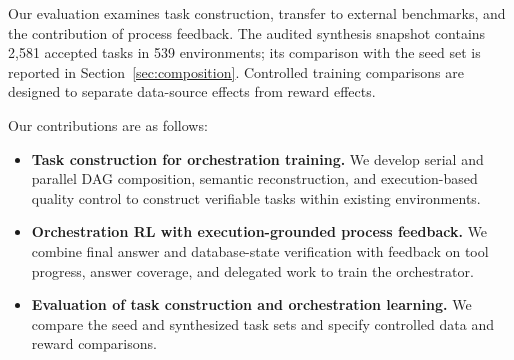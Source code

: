 Our evaluation examines task construction, transfer to external benchmarks, and the contribution of process feedback. The audited synthesis snapshot contains 2,581 accepted tasks in 539 environments; its comparison with the seed set is reported in Section~\ref{sec:composition}. Controlled training comparisons are designed to separate data-source effects from reward effects. 

Our contributions are as follows:
\begin{itemize}
  \item \textbf{Task construction for orchestration training.} We develop serial and parallel DAG composition, semantic reconstruction, and execution-based quality control to construct verifiable tasks within existing environments.
  \item \textbf{Orchestration RL with execution-grounded process feedback.} We combine final answer and database-state verification with feedback on tool progress, answer coverage, and delegated work to train the orchestrator.
  \item \textbf{Evaluation of task construction and orchestration learning.} We compare the seed and synthesized task sets and specify controlled data and reward comparisons. 
\end{itemize}
